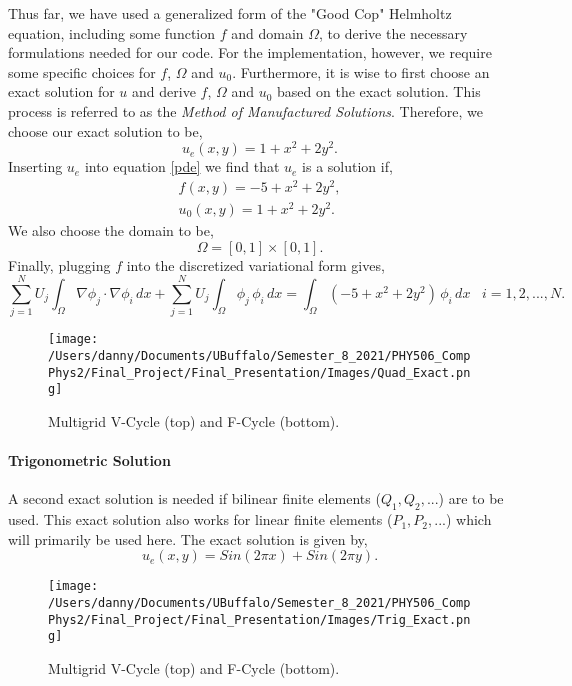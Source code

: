 \documentclass[]{article}
\theoremstyle{definition}
\begin{document}
Thus far, we have used a generalized form of the "Good Cop" Helmholtz equation, including some function $f$ and domain $\Omega$, to derive the necessary formulations needed for our code.  For the implementation, however, we require some specific choices for $f$, $\Omega$ and $u_0$.  Furthermore, it is wise to first choose an exact solution for $u$ and   derive $f$, $\Omega$ and $u_0$ based on the exact solution.  This process is referred to as the \textit{Method of Manufactured Solutions}.  Therefore, we choose our exact solution to be,
\begin{equation}
u_e(x,y) = 1 + x^2 + 2 y^2.
\end{equation}
Inserting $u_e$ into equation \eqref{pde} we find that $u_e$ is a solution if,
\begin{align}
f(x,y) = -5 + x^2 + 2 y^2, \\
u_0(x,y) = 1 + x^2 + 2 y^2.
\end{align}
We also choose the domain to be,
\begin{equation}
\Omega = [0,1] \times [0,1].
\end{equation}
Finally, plugging $f$ into the discretized variational form gives,
\begin{equation}
\sum^N_{j=1} U_j \int_{\Omega} \nabla \phi_j \cdot \nabla \phi_i \, dx + \sum^N_{j=1} U_j \int_{\Omega} \phi_j \, \phi_i \, dx = \int_{\Omega} (-5 + x^2 + 2 y^2) \, \phi_i \, dx \;\;\; i = 1,2,...,N.
\end{equation}

\begin{figure}[H]
\begin{center}
\texttt{[image: /Users/danny/Documents/UBuffalo/Semester\_8\_2021/PHY506\_CompPhys2/Final\_Project/Final\_Presentation/Images/Quad\_Exact.png]}
\end{center}
\caption{Multigrid V-Cycle (top) and F-Cycle (bottom).}
\label{QuadExact}
\end{figure}

\paragraph{Trigonometric Solution}

A second exact solution is needed if bilinear finite elements ($Q_1, Q_2,...$) are to be used.  This exact solution also works for linear finite elements ($P_1, P_2, ...$) which will primarily be used here.  The exact solution is given by,
\begin{equation}
u_e(x,y) = Sin(2 \pi x) + Sin(2 \pi y).
\end{equation}
\begin{figure}[H]
\begin{center}
\texttt{[image: /Users/danny/Documents/UBuffalo/Semester\_8\_2021/PHY506\_CompPhys2/Final\_Project/Final\_Presentation/Images/Trig\_Exact.png]}
\end{center}
\caption{Multigrid V-Cycle (top) and F-Cycle (bottom).}
\label{TrigExact}
\end{figure}
\end{document}
